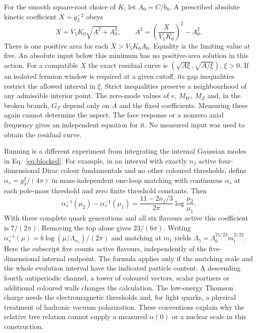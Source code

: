 \documentclass[aps,prd,reprint,onecolumn,nofootinbib,amsmath,amssymb]{revtex4-2}
\begin{document}
For the smooth square-root choice of $K$, let $A_0=C/b_0$. A prescribed absolute kinetic coefficient $X=g_2^{-2}$ obeys
\begin{equation}
 X=V_5 K_0\sqrt{A^2+A_0^2},\qquad
 A^2=\left(\frac{X}{V_5K_0}\right)^2-A_0^2 .
\end{equation}
There is one positive area for each $X>V_5K_0 A_0$. Equality is the limiting value at five. An absolute input below this minimum has no positive-area solution in this action. For a compatible $X$ the exact residual curve is $(\sqrt{A\xi},\sqrt{A/\xi})$, $\xi>0$. If an isolated fermion window is required at a given cutoff, its gap inequalities restrict the allowed interval in $\xi$. Strict inequalities preserve a neighbourhood of any admissible interior point. The zero-mode values of $e$, $M_W$, $M_Z$ and, in the broken branch, $G_F$ depend only on $A$ and the fixed coefficients. Measuring these again cannot determine the aspect. The face response or a nonzero axial frequency gives an independent equation for it. No measured input was used to obtain the residual curve.

Running is a different experiment from integrating the internal Gaussian modes in Eq.~\eqref{eq:blocked}. For example, in an interval with exactly $n_f$ active four-dimensional Dirac colour fundamentals and no other coloured thresholds, define $\alpha_s=g_3^2/(4\pi)$ in mass-independent one-loop matching with continuous $\alpha_s$ at each pole-mass threshold and zero finite threshold constants. Then
\begin{equation}
 \alpha_s^{-1}(\mu_2)-\alpha_s^{-1}(\mu_1)
 =\frac{11-2n_f/3}{2\pi}\log\frac{\mu_2}{\mu_1}.
\end{equation}
With three complete quark generations and all six flavours active this coefficient is $7/(2\pi)$. Removing the top alone gives $23/(6\pi)$. Writing $\alpha_s^{-1}(\mu)=b\log(\mu/\Lambda_{n_f})/(2\pi)$ and matching at $m_t$ yields $\Lambda_5=\Lambda_6^{21/23}m_t^{2/23}$. Here the subscript five counts active flavours, independently of the five-dimensional internal endpoint. The formula applies only if the matching scale and the whole evolution interval have the indicated particle content. A descending fourth antiperiodic channel, a tower of coloured vectors, scalar partners or additional coloured walls changes the calculation. The low-energy Thomson charge needs the electromagnetic thresholds and, for light quarks, a physical treatment of hadronic vacuum polarization. These conventions explain why the relative tree relation cannot supply a measured $\alpha(0)$ or a nuclear scale in this construction.
\end{document}
